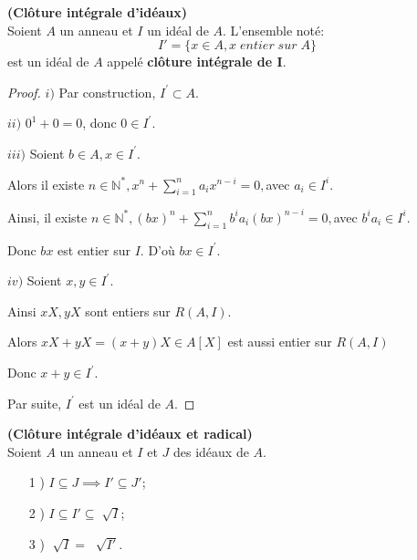 \begin{moncorollaire}\textbf{(Clôture intégrale d'idéaux)}\cite{Di2}\\
	Soient $A$ un anneau et $I$ un idéal de $A$.
	L'ensemble noté: 
	\[ I'=\{x \in A, x \; entier \; sur \; A \} \]
	est un idéal de $A$ appelé \textbf{clôture intégrale de I}.
\end{moncorollaire}
\begin{proof}
	$i)$ Par construction, $I^{\prime }\subset A.$
	
	$ii)$ $0^{1}+0=0$, donc $0\in I^{\prime }.$
	
	$iii)$ Soient $b\in A,x\in I^{\prime }.$
	
	Alors il existe $n\in \mathbb{N}^{\ast },x^{n}+\sum\limits_{i=1}^{n}a_{i}x^{n-i}=0,$avec $a_{i}\in I^{i}.$
	
	Ainsi, il existe $n\in \mathbb{N}^{\ast },(bx)^{n}+\sum\limits_{i=1}^{n}b^{i}a_{i}(bx)^{n-i}=0,$avec $
	b^{i}a_{i}\in I^{i}.$
	
	Donc $bx$ est entier sur $I.$ D'où $bx\in I^{\prime }.$
	
	$iv)$ Soient $x,y\in I^{\prime }.$
	
	Ainsi $xX,yX$ sont entiers sur $R(A,I).$
	
	Alors $xX+yX=(x+y)X\in A[X]$ est aussi entier sur $R(A,I)$
	
	Donc $x+y\in I^{\prime }.$
	
	Par suite, $I^{\prime }$ est un idéal de $A.$
\end{proof}
\begin{maremarque}\textbf{(Clôture intégrale d'idéaux et radical)}\cite{Di2} \\
	Soient $A$ un anneau et $I$ et $J$ des idéaux de $A$.
	\begin{enumerate}
		\item[1] ) $I \subseteq J \implies I' \subseteq J' $;
		\item[2] ) $I \subseteq I' \subseteq \sqrt[]{I} $;
		\item[3] ) $\sqrt[]{I} = \; \sqrt[]{I'} $.
	\end{enumerate}
\end{maremarque}
